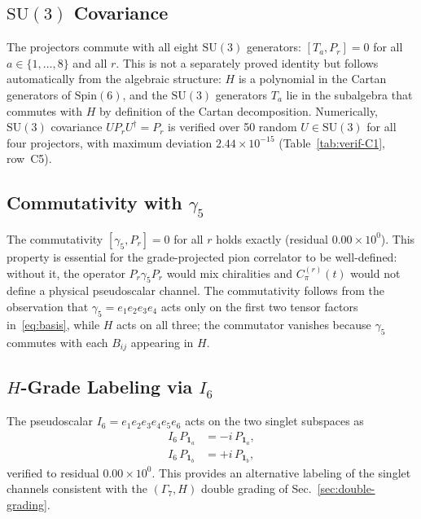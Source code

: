 \documentclass[12pt]{article}
\theoremstyle{definition}
\theoremstyle{remark}
\newcommand{\spin}{\mathrm{Spin}}       %
\newcommand{\su}{\mathrm{SU}}           %
\newcommand{\GaSeven}{\Gamma_7}                      %
\newcommand{\Isix}{I_6}                              %
\begin{document}
	\subsection{\texorpdfstring{$\su(3)$}{SU(3)} Covariance}
	\label{sec:proj-covariance}
	
	The projectors commute with all eight $\su(3)$ generators:
	$[T_a, P_r]=0$ for all $a\in\{1,\ldots,8\}$ and all $r$.  This is not a
	separately proved identity but follows automatically from the algebraic
	structure: $H$ is a polynomial in the Cartan generators of $\spin(6)$, and
	the $\su(3)$ generators $T_a$ lie in the subalgebra that commutes with $H$
	by definition of the Cartan decomposition.  Numerically, $\su(3)$ covariance
	$U P_r U^\dagger = P_r$ is verified over 50 random $U\in\su(3)$ for all
	four projectors, with maximum deviation $2.44\times10^{-15}$
	(Table~\ref{tab:verif-C1}, row~C5).
	
	\subsection{Commutativity with
		\texorpdfstring{$\gamma_5$}{gamma5}}
	\label{sec:proj-gamma5}
	
	The commutativity $[\gamma_5, P_r]=0$ for all $r$ holds exactly (residual
	$0.00\times10^0$).
	This property is essential for the grade-projected pion correlator to be
	well-defined: without it, the operator $P_r\gamma_5 P_r$ would mix
	chiralities and $C_\pi^{(r)}(t)$ would not define a physical pseudoscalar
	channel.  The commutativity follows from the observation that
	$\gamma_5 = e_1 e_2 e_3 e_4$ acts only on the first two tensor factors
	in~\eqref{eq:basis}, while $H$ acts on all three; the commutator vanishes
	because $\gamma_5$ commutes with each $B_{ij}$ appearing in $H$.
	
	\subsection{\texorpdfstring{$H$}{H}-Grade Labeling via
		\texorpdfstring{$\Isix$}{I6}}
	\label{sec:proj-I6}
	
	The pseudoscalar $\Isix = e_1 e_2 e_3 e_4 e_5 e_6$ acts on the two singlet
	subspaces as
	\begin{equation}
		\begin{aligned}
			\Isix\,P_{\mathbf{1}_a} &= -i\,P_{\mathbf{1}_a}, \\
			\Isix\,P_{\mathbf{1}_b} &= +i\,P_{\mathbf{1}_b},
		\end{aligned}
		\label{eq:I6-singlet}
	\end{equation}
	verified to residual $0.00\times10^0$.
	This provides an alternative labeling of the singlet channels consistent with
	the $(\GaSeven, H)$ double grading of Sec.~\ref{sec:double-grading}.
	
\end{document}
